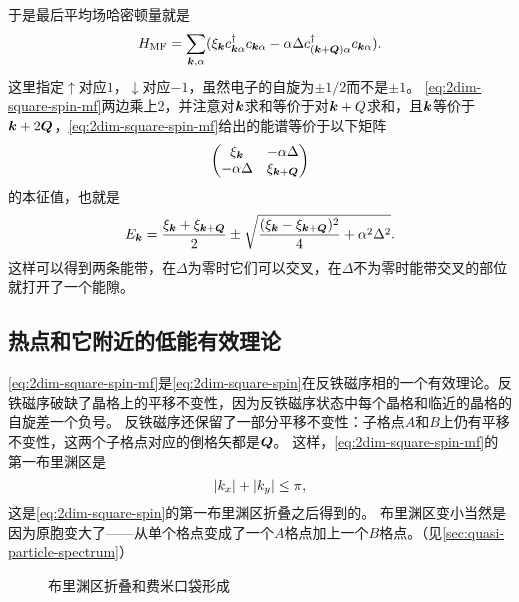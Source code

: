 于是最后平均场哈密顿量就是
\begin{equation}
    {H}_\text{MF} = \sum_{\vb*{k}, \alpha} (\xi_{\vb*{k}} {c}_{\vb*{k} \alpha}^\dagger {c}_{\vb*{k} \alpha} - \alpha \Delta {c}_{(\vb*{k} + \vb*{Q}) \alpha}^\dagger {c}_{\vb*{k} \alpha}).
    \label{eq:2dim-square-spin-mf}
\end{equation}
这里指定$\uparrow$对应$1$，$\downarrow$对应$-1$，虽然电子的自旋为$\pm 1/2$而不是$\pm 1$。
\eqref{eq:2dim-square-spin-mf}两边乘上2，并注意对$\vb*{k}$求和等价于对$\vb*{k}+Q$求和，且$\vb*{k}$等价于$\vb*{k}+2\vb*{Q}$，\eqref{eq:2dim-square-spin-mf}给出的能谱等价于以下矩阵
\[
    \pmqty{\xi_{\vb*{k}} & - \alpha \Delta \\ - \alpha \Delta & \xi_{\vb*{k} + \vb*{Q}}}
\]
的本征值，也就是
\begin{equation}
    E_{\vb*{k}} = \frac{\xi_{\vb*{k}} + \xi_{\vb*{k} + \vb*{Q}}}{2} \pm \sqrt{\frac{(\xi_{\vb*{k}} - \xi_{\vb*{k}+\vb*{Q}})^2}{4} + \alpha^2 \Delta^2}.
\end{equation}
这样可以得到两条能带，在$\Delta$为零时它们可以交叉，在$\Delta$不为零时能带交叉的部位就打开了一个能隙。

\subsection{热点和它附近的低能有效理论}

\eqref{eq:2dim-square-spin-mf}是\eqref{eq:2dim-square-spin}在反铁磁序相的一个有效理论。反铁磁序破缺了晶格上的平移不变性，因为反铁磁序状态中每个晶格和临近的晶格的自旋差一个负号。
反铁磁序还保留了一部分平移不变性：子格点$A$和$B$上仍有平移不变性，这两个子格点对应的倒格矢都是$\vb*{Q}$。
这样，\eqref{eq:2dim-square-spin-mf}的第一布里渊区是
\[
    \abs{k_x} + \abs{k_y} \leq \pi,
\]
这是\eqref{eq:2dim-square-spin}的第一布里渊区折叠之后得到的。
布里渊区变小当然是因为原胞变大了——从单个格点变成了一个$A$格点加上一个$B$格点。（见\autoref{sec:quasi-particle-spectrum}）

\begin{figure}
    \centering
    \subfigure[一个单带模型的第一布里渊区和费米面]{
        
    }
    \subfigure[热点]{
        
    }
    \caption{布里渊区折叠和费米口袋形成}
\end{figure}

